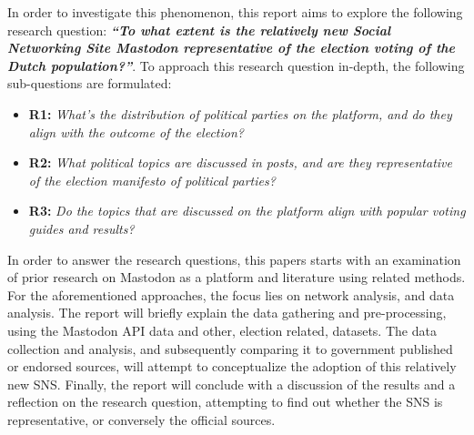 In order to investigate this phenomenon, this report aims to explore the following research question:
\textbf{\textit{“To what extent is the relatively new Social Networking Site Mastodon representative of the election voting  of the Dutch population?”}}.
To approach this research question in-depth, the following sub-questions are formulated:
\begin{itemize}
  \item \textbf{R1:} \textit{What's the distribution of political parties on the platform, and do they align with the outcome of the election? }
  \item \textbf{R2:} \textit{What political topics are discussed in posts, and are they representative of the election manifesto of political parties? }
  \item \textbf{R3:} \textit{Do the topics that are discussed on the platform align with popular voting guides and results?}
\end{itemize}

In order to answer the research questions, this papers starts with an examination of prior research on Mastodon as a platform and literature using related methods.
For the aforementioned approaches, the focus lies on network analysis, and data analysis.
The report will briefly explain the data gathering and pre-processing, using the Mastodon API data and other, election related, datasets.
The data collection and analysis, and subsequently comparing it to government published or endorsed sources, will attempt to conceptualize the adoption of this relatively new SNS.
Finally, the report will conclude with a discussion of the results and a reflection on the research question, attempting to find out whether the SNS is representative, or conversely the official sources.